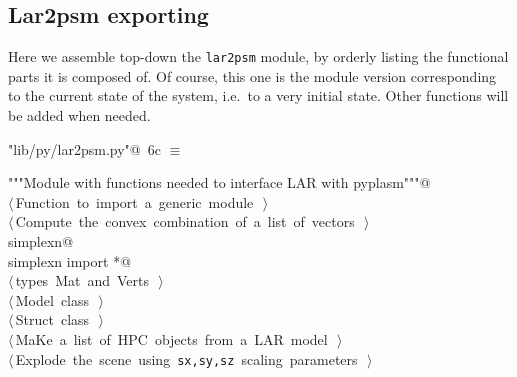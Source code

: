 \documentclass[11pt,oneside]{article}	%
\begin{document}
\subsection{Lar2psm exporting}
\label{sec:lar2psm}
Here we assemble top-down the \texttt{lar2psm} module, by orderly listing the functional parts it is composed of. Of course, this one is the module version corresponding to the current state of the system, i.e.~to a very initial state. Other functions will be added when needed.
\begin{flushleft} \small \label{scrap16}
\protect{}\verb@"lib/py/lar2psm.py"@\nobreak\ {\footnotesize 6c }$\equiv$
\vspace{-1ex}
\begin{list}{}{} \item
\mbox{}\verb@"""Module with functions needed to interface LAR with pyplasm"""@\\
\mbox{}\verb@@\hbox{$\langle\,$Function to import a generic module\nobreak\ {\footnotesize {}}$\,\rangle$}\verb@@\\
\mbox{}\verb@@\hbox{$\langle\,$Compute the convex combination of a list of vectors\nobreak\ {\footnotesize {}}$\,\rangle$}\verb@@\\
\mbox{}\verb@import simplexn@\\
\mbox{}\verb@from simplexn import *@\\
\mbox{}\verb@@\hbox{$\langle\,$types Mat and Verts\nobreak\ {\footnotesize {}}$\,\rangle$}\verb@@\\
\mbox{}\verb@@\hbox{$\langle\,$Model class\nobreak\ {\footnotesize {}}$\,\rangle$}\verb@@\\
\mbox{}\verb@@\hbox{$\langle\,$Struct class\nobreak\ {\footnotesize {}}$\,\rangle$}\verb@@\\
\mbox{}\verb@@\hbox{$\langle\,$MaKe a list of HPC objects from a LAR model\nobreak\ {\footnotesize {}}$\,\rangle$}\verb@@\\
\mbox{}\verb@@\hbox{$\langle\,$Explode the scene using \texttt{sx,sy,sz} scaling parameters\nobreak\ {\footnotesize {}}$\,\rangle$}\verb@@\\
\mbox{}\verb@@{\NWsep}
\end{list}
\vspace{-2ex}
\end{flushleft}
\end{document}
